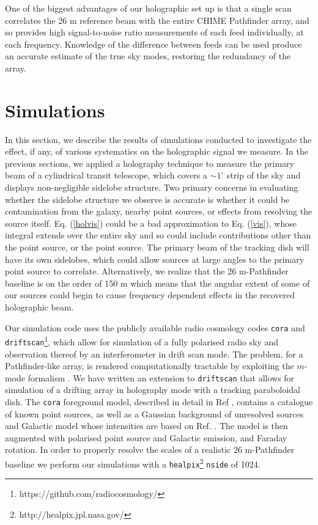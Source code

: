 One of the biggest advantages of our holographic set up is that a single scan correlates the 26 m reference beam with the entire CHIME Pathfinder array, and so provides high signal-to-noise ratio measurements of each feed individually, at each frequency. Knowledge of the difference between feeds can be used produce an accurate estimate of the true sky modes, restoring the redundancy of the array. 

\section{Simulations} \label{ch:hol:sec:sims}

In this section, we describe the results of simulations conducted to investigate the effect, if any, of various systematics on the holographic signal we measure. In the previous sections, we applied a holography technique to measure the primary beam of a cylindrical transit telescope, which covers a $\sim 1^{\circ}$ strip of the sky and displays non-negligible sidelobe structure. Two primary concerns in evaluating whether the sidelobe structure we observe is accurate is whether it could be contamination from the galaxy, nearby point sources, or effects from resolving the source itself. Eq. (\ref{holvis}) could be a bad approximation to Eq. (\ref{vis}), whose integral extends over the entire sky and so could include contributions other than the point source, or the point source. The primary beam of the tracking dish will have its own sidelobes, which could allow sources at large angles to the primary point source to correlate. Alternatively, we realize that the 26 m-Pathfinder baseline is on the order of 150 m which means that the angular extent of some of our sources could begin to cause frequency dependent effects in the recovered holographic beam. 

Our simulation code uses the publicly available radio cosmology codes \texttt{cora} and \texttt{driftscan}\footnote{https://github.com/radiocosmology/}, which allow for simulation of a fully polarised radio sky and observation thereof by an interferometer in drift scan mode. The problem, for a Pathfinder-like array, is rendered computationally tractable by exploiting the $m$-mode formalism \citep{mmodes1, mmodes2}. We have written an extension to \texttt{driftscan} that allows for simulation of a drifting array in holography mode with a tracking paraboloidal dish. The \texttt{cora} foreground model, described in detail in Ref \citep{mmodes2}, contains a catalogue of known point sources, as well as a Gaussian background of unresolved sources and Galactic model whose intensities are based on Ref. \citep{santoscoorayknox}. The model is then augmented with polarised point source and Galactic emission, and Faraday rotation. In order to properly resolve the scales of a realistic 26 m-Pathfinder baseline we perform our simulations with a \texttt{healpix}\footnote{http://healpix.jpl.nasa.gov/} \citep{gorski} \texttt{nside} of 1024.


